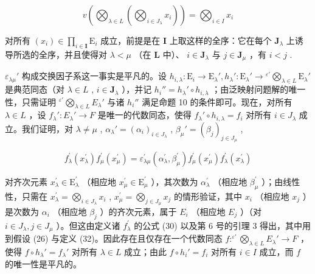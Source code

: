\[
v \left(\bigotimes_ {\lambda \in L} \left(\bigotimes_ {i \in J _ {\lambda}} x _ {i}\right)\right) = \bigotimes_ {i \in I} x _ {i}\tag{33}
\]

对所有 \((x_{i})\in \prod_{i\in \mathbf{I}}\mathrm{E}_{i}\) 成立，前提是在 \(\mathbf{I}\) 上取这样的全序：它在每个 \(\mathbf{J}_{\lambda}\) 上诱导所选的全序，并且使得对 \(\lambda < \mu\) （在 \(\mathbf{L}\) 中）、 \(i\in \mathbf{J}_{\lambda}\) 与 \(j\in \mathbf{J}_{\mu}\) ，有 \(i < j\) .

\(\varepsilon_{\lambda \mu}'\) 构成交换因子系这一事实是平凡的。设 \(h_{i,\lambda}:\mathrm{E}_i\to \mathrm{E}_{\lambda}', h_{\lambda}':\mathrm{E}_{\lambda}'\to {}^{\varepsilon'}\bigotimes_{\lambda \in L}\mathrm{E}_{\lambda}'\) 是典范同态（对 \(\lambda \in L\) , \(i\in \mathbf{J}_{\lambda}\) ），并记 \(h_i'' = h_\lambda' \circ h_{i,\lambda}\) ；由泛映射问题解的唯一性，只需证明 \({}^{\varepsilon'}\bigotimes_{\lambda \in L} E_{\lambda}'\) 与诸 \(h_i''\) 满足命题 10 的条件即可。现在，对所有 \(\lambda \in L\) ，设 \(f_{\lambda}': E_{\lambda}' \to F\) 是唯一的代数同态，使得 \(f_{\lambda}' \circ h_{i,\lambda} = f_i\) 对所有 \(i \in J_{\lambda}\) 成立。我们证明，对 \(\lambda \neq \mu\) , \(\alpha_{\lambda}' = (\alpha_i)_{i \in J_{\lambda}}\) , \(\beta_{\mu}' = (\beta_j)_{j \in J_{\mu}}\) ,

\[
f _ {\lambda} ^ {\prime} (x _ {\lambda} ^ {\prime}) f _ {\mu} ^ {\prime} (x _ {\mu} ^ {\prime}) = \varepsilon_ {\lambda \mu} ^ {\prime} (\alpha_ {\lambda} ^ {\prime}, \beta_ {\mu} ^ {\prime}) f _ {\mu} ^ {\prime} (x _ {\mu} ^ {\prime}) f _ {\lambda} ^ {\prime} (x _ {\lambda} ^ {\prime})\tag{34}
\]

对齐次元素 \(x_{\lambda}^{\prime} \in \mathrm{E}_{\lambda}^{\prime}\) （相应地 \(x_{\mu}^{\prime} \in \mathrm{E}_{\mu}^{\prime}\) ），其次数为 \(\alpha_{\lambda}^{\prime}\) （相应地 \(\beta_{\mu}^{\prime}\) ）；由线性性，只需在 \(x_{\lambda}^{\prime} = \bigotimes_{i \in J_{\lambda}} x_{i}\) , \(x_{\mu}^{\prime} = \bigotimes_{j \in J_{\mu}} x_{j}\) 的情形验证，其中 \(x_{i}\) （相应地 \(x_{j}\) ）是次数为 \(\alpha_{i}\) （相应地 \(\beta_{j}\) ）的齐次元素，属于 \(E_{i}\) （相应地 \(E_{j}\) ）（对 \(i \in J_{\lambda}, j \in J_{\mu}\) ）。但这由定义诸 \(f_{\lambda}^{\prime}\) 的公式 (30) 以及第 6 号的引理 3 得出，其中用到假设 (26) 与定义 (32)。因此存在且仅存在一个代数同态 \(f: ^{\varepsilon'} \bigotimes_{\lambda \in L} E_{\lambda}' \to F\) ，使得 \(f \circ h_{\lambda}' = f_{\lambda}'\) 对所有 \(\lambda \in L\) 成立；由此 \(f \circ h_{i}' = f_{i}\) 对所有 \(i \in I\) 成立，而 \(f\) 的唯一性是平凡的。

